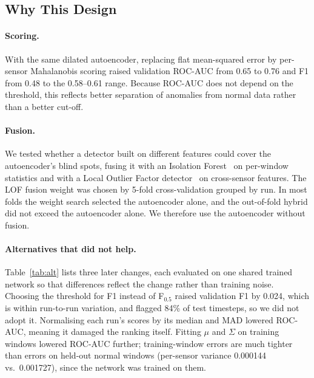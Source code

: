 \documentclass[runningheads]{llncs}
\begin{document}
\subsection{Why This Design}

\paragraph{Scoring.} With the same dilated autoencoder, replacing flat mean-squared error by per-sensor Mahalanobis scoring raised validation ROC-AUC from 0.65 to 0.76 and F1 from 0.48 to the 0.58--0.61 range. Because ROC-AUC does not depend on the threshold, this reflects better separation of anomalies from normal data rather than a better cut-off.

\paragraph{Fusion.} We tested whether a detector built on different features could cover the autoencoder's blind spots, fusing it with an Isolation Forest~\cite{liu2008isolation} on per-window statistics and with a Local Outlier Factor detector~\cite{breunig2000lof} on cross-sensor features. The LOF fusion weight was chosen by 5-fold cross-validation grouped by run. In most folds the weight search selected the autoencoder alone, and the out-of-fold hybrid did not exceed the autoencoder alone. We therefore use the autoencoder without fusion.

\paragraph{Alternatives that did not help.} Table~\ref{tab:alt} lists three later changes, each evaluated on one shared trained network so that differences reflect the change rather than training noise. Choosing the threshold for F1 instead of F$_{0.5}$ raised validation F1 by 0.024, which is within run-to-run variation, and flagged 84\% of test timesteps, so we did not adopt it. Normalising each run's scores by its median and MAD lowered ROC-AUC, meaning it damaged the ranking itself. Fitting $\mu$ and $\Sigma$ on training windows lowered ROC-AUC further; training-window errors are much tighter than errors on held-out normal windows (per-sensor variance 0.000144 vs.\ 0.001727), since the network was trained on them.
\end{document}
